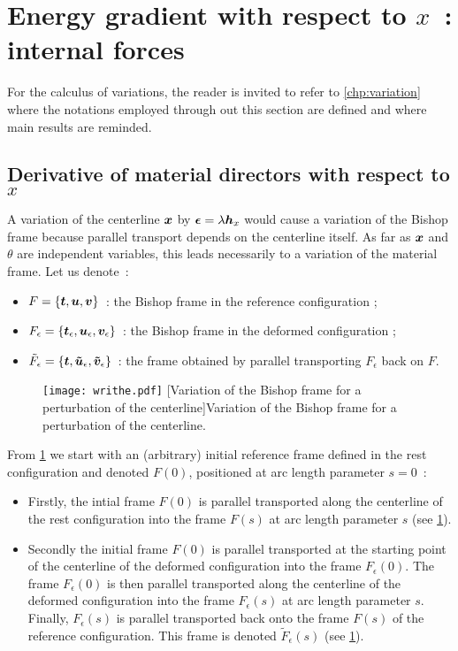 \section{Energy gradient with respect to $x$~: internal forces}\label{sec:dE_dx}

For the calculus of variations, the reader is invited to refer to \cref{chp:variation} where the notations employed through out this section are defined and where main results are reminded. 

\subsection{Derivative of material directors with respect to $x$}
A variation of the centerline $\boldsymbol{x}$ by $\boldsymbol{\epsilon} = \lambda \boldsymbol{h}_x$ would cause a variation of the Bishop frame because parallel transport depends on the centerline itself. As far as $\boldsymbol{x}$ and $\theta$ are independent variables, this leads necessarily to a variation of the material frame. Let us denote~:
\begin{itemize}
\item
$F = \{\boldsymbol{t}, \boldsymbol{u},\boldsymbol{v}\}$~: the Bishop frame in the reference configuration ;
\item
 $F_\epsilon = \{\boldsymbol{t}_\epsilon, \boldsymbol{u}_\epsilon,\boldsymbol{v}_\epsilon\}$~: the Bishop frame in the deformed configuration ;
 \item
$\tilde{F}_\epsilon = \{\boldsymbol{t}, \boldsymbol{\tilde{u}}_\epsilon,\boldsymbol{\tilde{v}}_\epsilon\}$~: the frame obtained by parallel transporting $F_\epsilon$ back on $F$.
\end{itemize}
\begin{figure}[p]
\begin{fullpage}
\centering
\texttt{[image: writhe.pdf]}
[Variation of the Bishop frame for a perturbation of the centerline]{Variation of the Bishop frame for a perturbation of the centerline.}
\label{fig:varbishop}
\end{fullpage}
\end{figure}
From \cref{fig:varbishop} we start with an (arbitrary) initial reference frame defined in the rest configuration and denoted $F(0)$, positioned at arc length parameter $s=0$~:
\begin{itemize}
\item 
Firstly, the intial frame $F(0)$ is parallel transported along the centerline of the rest configuration into the frame $F(s)$ at arc length parameter $s$ (see \cref{fig:varbishop}).
\item
Secondly the initial frame $F(0)$ is parallel transported at the starting point of the centerline of the deformed configuration into the frame $F_{\epsilon}(0)$. The frame $F_{\epsilon}(0)$ is then parallel transported along the centerline of the deformed configuration into the frame $F_{\epsilon}(s)$ at arc length parameter $s$. Finally, $F_{\epsilon}(s)$ is parallel transported back onto the frame $F(s)$ of the reference configuration. This frame is denoted $\tilde{F}_\epsilon(s)$ (see \cref{fig:varbishop}).
\end{itemize}

